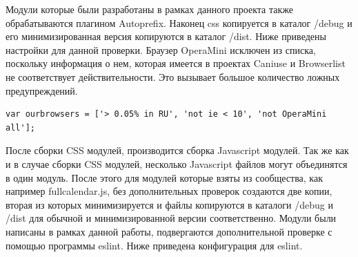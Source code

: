  
Модули которые были разработаны в рамках данного проекта также обрабатываются плагином Autoprefix. Наконец css копируется в каталог /debug и его минимизированная версия копируются в каталог /dist. Ниже приведены настройки для данной проверки. Браузер OperaMini исключен из списка, поскольку информация о нем, которая имеется в проектах Caniuse и Browserlist не соответствует действительности. Это вызывает большое количество ложных предупреждений.  

\begin{small}
\begin{verbatim}
var ourbrowsers = ['> 0.05% in RU', 'not ie < 10', 'not OperaMini all'];
\end{verbatim}
\end{small}

После сборки CSS модулей, производится сборка Javascript модулей. Так же как и в случае сборки CSS модулей, несколько Javascript файлов могут объединятся в один модуль. После этого для модулей которые взяты из сообщества, как например fullcalendar.js, без дополнительных проверок создаются две копии, вторая из которых минимизируется и файлы копируются в каталоги /debug и /dist для обычной и минимизированной версии соответственно. Модули были написаны в рамках данной работы, подвергаются дополнительной проверке с помощью программы eslint. Ниже приведена конфигурация для eslint.  


